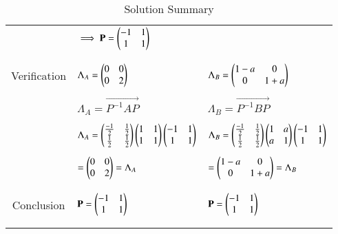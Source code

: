 \documentclass[journal,12pt]{IEEEtran}
\begin{document}
\begin{longtable}{|c|l|l|}
     &$ \implies \mathbf{P}=\begin{pmatrix}-1&1\\1&1\end{pmatrix}$\\
     &&\\
\hline
     &&\\
     Verification
     & $\Lambda_A=\begin{pmatrix}0&0\\0&2\end{pmatrix}$ &
       $\Lambda_B=\begin{pmatrix}1-a&0\\0&1+a\end{pmatrix}$\\
     &&\\
     & $\Lambda_{A}=\vec{P^{-1}AP}$&$\Lambda_{B}=\vec{P^{-1}BP}$\\
     &&\\
     & $\Lambda_A=\begin{pmatrix}\frac{-1}{2}&\frac{1}{2}\\ \frac 
     {1}{2}&\frac{1}{2}\end{pmatrix} \begin{pmatrix}1&1\\1&1\end{pmatrix} \begin{pmatrix}-1&1\\1&1\end{pmatrix}$
     & $\Lambda_B=\begin{pmatrix}\frac{-1}{2}&\frac{1}{2}\\ \frac
     {1}{2}&\frac{1}{2}\end{pmatrix} \begin{pmatrix}1&a\\a&1\end{pmatrix} \begin{pmatrix}-1&1\\1&1\end{pmatrix}$\\
     &&\\
     & $=\begin{pmatrix}0&0\\0&2\end{pmatrix}=\Lambda_A$ 
     & $=\begin{pmatrix}1-a&0\\0&1+a\end{pmatrix}=\Lambda_B$\\
     &&\\
     \hline
     &&\\
     Conclusion
     & $\mathbf{P}=\begin{pmatrix}-1&1\\1&1\end{pmatrix}$
     & $\mathbf{P}=\begin{pmatrix}-1&1\\1&1\end{pmatrix}$\\
     &&\\
\hline
\caption{Solution Summary}
\label{table:2}
\end{longtable}
\end{document}
